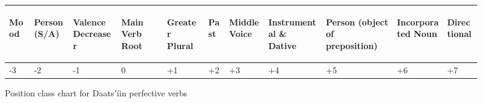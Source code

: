 \documentclass[output=paper]{langsci/langscibook}
\begin{document}
\begin{figure}
\begin{tabularx}{\textwidth}{XXXXXXXXXXp{2cm}}
\begin{turn}{33} Mood \end{turn} & \begin{turn}{33} Person (S/A) \end{turn} & \begin{turn}{33} Valence Decreaser \end{turn} & \begin{turn}{33} Main Verb Root \end{turn} & \begin{turn}{33} Greater Plural \end{turn} & \begin{turn}{33} Past \end{turn} & \begin{turn}{33} Middle Voice \end{turn} & \begin{turn}{33} Instrumental \& Dative \end{turn} & \begin{turn}{33} Person (object of preposition) \end{turn} & \begin{turn}{33} Incorporated Noun \end{turn} & \begin{turn}{33} Directional \end{turn} \\
\midrule
\multicolumn{1}{X}{{}-3} & \multicolumn{1}{X}{{}-2} & \multicolumn{1}{X}{{}-1} & \multicolumn{1}{X}{0} & \multicolumn{1}{X}{+1} & \multicolumn{1}{X}{+2} & \multicolumn{1}{X}{+3} & \multicolumn{1}{X}{+4} & \multicolumn{1}{X}{+5} & \multicolumn{1}{X}{+6} & +7\\
\end{tabularx}
\caption{Position class chart for Daatsʼíin perfective verbs}
\label{fig:ahlandc:2}
\end{figure}
\end{document}
